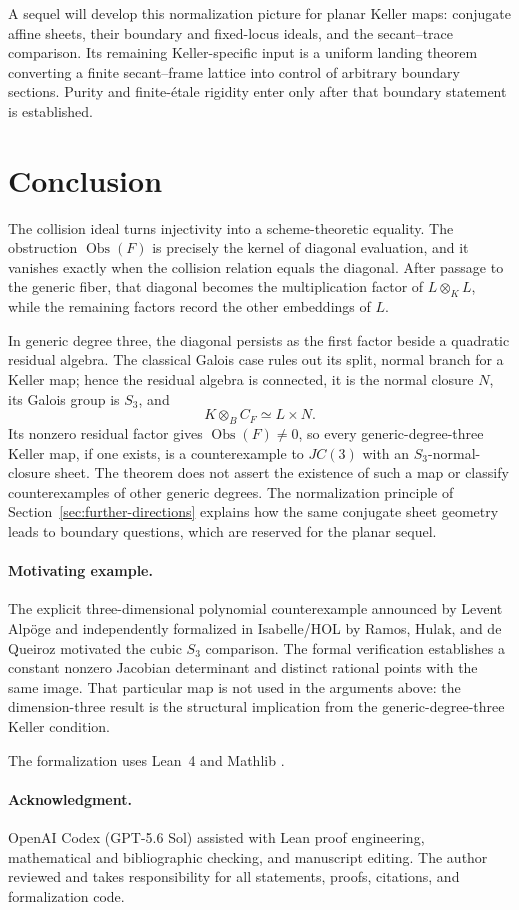 \documentclass[11pt]{article}
\theoremstyle{remark}
\theoremstyle{definition}
\newcommand{\Obs}{\operatorname{Obs}}
\begin{document}
A sequel will develop this normalization picture for planar Keller maps:
conjugate affine sheets, their boundary and fixed-locus ideals, and the
secant--trace comparison.  Its remaining Keller-specific input is a
uniform landing theorem converting a finite secant--frame lattice into
control of arbitrary boundary sections.  Purity and finite-\'etale
rigidity enter only after that boundary statement is established.

\section{Conclusion}
\label{sec:conclusion}

The collision ideal turns injectivity into a scheme-theoretic equality.  The
obstruction \(\Obs(F)\) is precisely the kernel of diagonal evaluation,
and it vanishes exactly when the collision relation equals the diagonal.
After passage to the generic fiber, that diagonal becomes the
multiplication factor of \(L\otimes_KL\), while the remaining factors
record the other embeddings of \(L\).

In generic degree three, the diagonal persists as the first factor beside
a quadratic residual algebra.  The classical Galois case rules out its
split, normal branch for a Keller map; hence the residual algebra is connected, it is
the normal closure \(N\), its Galois group is \(S_3\), and
\[
  K\otimes_BC_F\simeq L\times N.
\]
Its nonzero residual factor gives \(\Obs(F)\neq0\), so every
generic-degree-three Keller map, if one exists, is a counterexample to
\(JC(3)\) with an \(S_3\)-normal-closure sheet.  The theorem does not
assert the existence of such a map or classify counterexamples of other
generic degrees.
The normalization principle
of Section~\ref{sec:further-directions} explains how the same conjugate
sheet geometry leads to boundary questions, which are reserved for the
planar sequel.

\paragraph{Motivating example.}
The explicit three-dimensional polynomial counterexample announced by
Levent Alpöge \cite{Alpoge2026} and independently formalized in
Isabelle/HOL by Ramos, Hulak, and de Queiroz
\cite{AFPJacobianCounterexample} motivated the cubic \(S_3\) comparison.
The formal verification establishes a
constant nonzero Jacobian determinant and distinct rational points with
the same image.  That particular map is not used in the arguments above:
the dimension-three result is the structural implication from the
generic-degree-three Keller condition.

The formalization uses Lean~4 and Mathlib \cite{Lean4,Mathlib}.

\paragraph{Acknowledgment.}
OpenAI Codex (GPT-5.6 Sol) assisted with Lean proof engineering,
mathematical and bibliographic checking, and manuscript editing.  The
author reviewed and takes responsibility for all statements, proofs,
citations, and formalization code.



\end{document}
